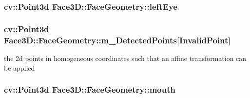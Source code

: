 \subsubsection[{\texorpdfstring{left\+Eye}{leftEye}}]{\setlength{\rightskip}{0pt plus 5cm}cv\+::\+Point3d Face3\+D\+::\+Face\+Geometry\+::left\+Eye\hspace{0.3cm}{\ttfamily [private]}}\hypertarget{class_face3_d_1_1_face_geometry_a67446b08935c867d465743452d674f71}{}\label{class_face3_d_1_1_face_geometry_a67446b08935c867d465743452d674f71}
\subsubsection[{\texorpdfstring{m\+\_\+\+Detected\+Points}{m_DetectedPoints}}]{\setlength{\rightskip}{0pt plus 5cm}cv\+::\+Point3d Face3\+D\+::\+Face\+Geometry\+::m\+\_\+\+Detected\+Points\mbox{[}{\bf Invalid\+Point}\mbox{]}\hspace{0.3cm}{\ttfamily [private]}}\hypertarget{class_face3_d_1_1_face_geometry_a695d2f7b17ed80f56f4e6af44c796a9a}{}\label{class_face3_d_1_1_face_geometry_a695d2f7b17ed80f56f4e6af44c796a9a}


the 2d points in homogeneous coordinates such that an affine transformation can be applied 

\subsubsection[{\texorpdfstring{mouth}{mouth}}]{\setlength{\rightskip}{0pt plus 5cm}cv\+::\+Point3d Face3\+D\+::\+Face\+Geometry\+::mouth\hspace{0.3cm}{\ttfamily [private]}}\hypertarget{class_face3_d_1_1_face_geometry_a1c36fe81650a276b523d8dc17b30038e}{}\label{class_face3_d_1_1_face_geometry_a1c36fe81650a276b523d8dc17b30038e}
